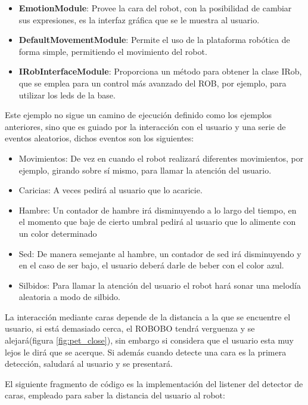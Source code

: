 \begin{itemize}
	\item \textbf{EmotionModule}: Provee la cara del robot, con la posibilidad de cambiar sus expresiones, es la interfaz gráfica que se le muestra al usuario.
	\item \textbf{DefaultMovementModule}: Permite el uso de la plataforma robótica de forma simple, permitiendo el movimiento del robot.
	\item \textbf{IRobInterfaceModule}: Proporciona un método para obtener la clase IRob, que se emplea para un control más avanzado del ROB, por ejemplo, para utilizar los leds de la base.
\end{itemize}


Este ejemplo no sigue un camino de ejecución definido como los ejemplos anteriores, sino que es guiado por la interacción con el usuario y una serie de eventos aleatorios, dichos eventos son los siguientes:

\begin{itemize}
	\item Movimientos: De vez en cuando el robot realizará diferentes movimientos, por ejemplo, girando sobre sí mismo, para llamar la atención del usuario.
	\item Caricias: A veces pedirá al usuario que lo acaricie.
	\item Hambre: Un contador de hambre irá disminuyendo a lo largo del tiempo, en el momento que baje de cierto umbral pedirá al usuario que lo alimente con un color determinado
	\item Sed: De manera semejante al hambre, un  contador de sed irá disminuyendo y en el caso de ser bajo, el usuario deberá darle de beber con el color azul.
	\item Silbidos: Para llamar la atención del usuario el robot hará sonar una melodía aleatoria a modo de silbido.
\end{itemize}

La interacción mediante caras depende de la distancia a la que se encuentre el usuario, si está demasiado cerca, el ROBOBO tendrá verguenza y se alejará(figura \ref{fig:pet_close}), sin embargo si considera que el usuario esta muy lejos le dirá que se acerque. Si además cuando detecte una cara es la primera detección, saludará al usuario y se presentará.

El siguiente fragmento de código es la implementación del listener del detector de caras, empleado para saber la distancia del usuario al robot:

